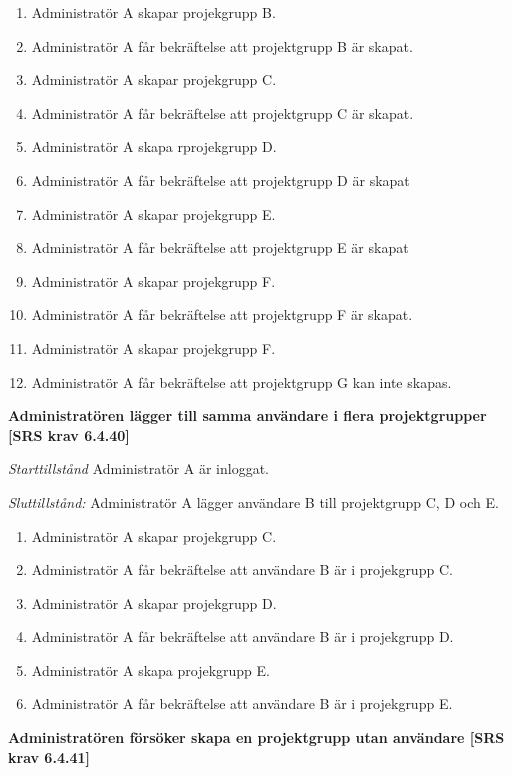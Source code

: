 \documentclass[a4paper]{article}
\begin{document}
\begin{FT}
\begin{enumerate}
\item Administratör A skapar projekgrupp B.
\item Administratör A får bekräftelse att projektgrupp B är skapat.
\item Administratör A skapar projekgrupp C.
\item Administratör A får bekräftelse att projektgrupp C är skapat.
\item Administratör A skapa rprojekgrupp D.
\item Administratör A får bekräftelse att projektgrupp D är skapat
\item Administratör A skapar projekgrupp E.
\item Administratör A får bekräftelse att projektgrupp E är skapat
\item Administratör A skapar projekgrupp F.
\item Administratör A får bekräftelse att projektgrupp F är skapat.
\item Administratör A skapar projekgrupp F.
\item Administratör A får bekräftelse att projektgrupp G kan inte skapas.
\end{enumerate}

\item %
\textbf{Administratören lägger till samma användare i flera projektgrupper [SRS krav 6.4.40]}

\emph{Starttillstånd} Administratör A är inloggat.

\emph{Sluttillstånd:} Administratör A lägger användare B till   projektgrupp C, D och E.

\begin{enumerate}
\item Administratör A skapar projekgrupp C.
\item Administratör A får bekräftelse att användare B är i projekgrupp C.
\item Administratör A skapar projekgrupp D.
\item Administratör A får bekräftelse att användare B är i projekgrupp D.
\item Administratör A skapa projekgrupp E.
\item Administratör A får bekräftelse att användare B är i projekgrupp E.
\end{enumerate}

\item %
\textbf{Administratören försöker skapa en projektgrupp utan användare [SRS krav 6.4.41]}


\end{FT}
\end{document}
